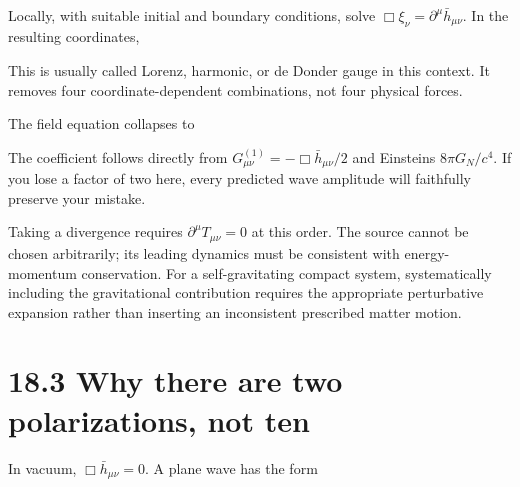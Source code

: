 \documentclass[
  11pt,
  letterpaper,
  oneside,
  openany]{scrbook}
\begin{document}
Locally, with suitable initial and boundary conditions, solve
\(\Box\xi_\nu=\partial^\mu\bar h_{\mu\nu}\). In the resulting
coordinates,

\begin{center}
\begingroup
{}
\ifdim\wd\grmathbox>\linewidth
\resizebox{\linewidth}{!}{\usebox{\grmathbox}}
\else\usebox{\grmathbox}\fi
\endgroup
\end{center}

This is usually called Lorenz, harmonic, or de Donder gauge in this
context. It removes four coordinate-dependent combinations, not four
physical forces.

The field equation collapses to

\begin{center}
\begingroup
{}
\ifdim\wd\grmathbox>\linewidth
\resizebox{\linewidth}{!}{\usebox{\grmathbox}}
\else\usebox{\grmathbox}\fi
\endgroup
\end{center}

The coefficient follows directly from
\(G^{(1)}_{\mu\nu}=-\Box\bar h_{\mu\nu}/2\) and
Einstein\textquotesingle s \(8\pi G_N/c^4\). If you lose a factor of two
here, every predicted wave amplitude will faithfully preserve your
mistake.

Taking a divergence requires \(\partial^\mu T_{\mu\nu}=0\) at this
order. The source cannot be chosen arbitrarily; its leading dynamics
must be consistent with energy-momentum conservation. For a
self-gravitating compact system, systematically including the
gravitational contribution requires the appropriate perturbative
expansion rather than inserting an inconsistent prescribed matter
motion.

\hypertarget{why-there-are-two-polarizations-not-ten}{%
\section{18.3 Why there are two polarizations, not
ten}\label{why-there-are-two-polarizations-not-ten}}

In vacuum, \(\Box\bar h_{\mu\nu}=0\). A plane wave has the form

\begin{center}
\begingroup
{}
\ifdim\wd\grmathbox>\linewidth
\resizebox{\linewidth}{!}{\usebox{\grmathbox}}
\else\usebox{\grmathbox}\fi
\endgroup
\end{center}
\end{document}

